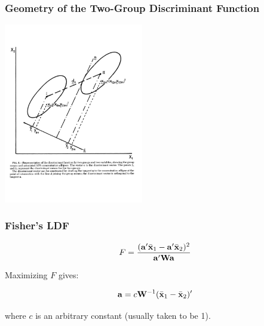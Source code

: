 \documentclass{beamer}
\begin{document}
\begin{frame}
  \frametitle{Geometry of the Two-Group Discriminant Function}

\begin{center}
\includegraphics[height=3.1in]{2group}
\end{center}

\end{frame}

\begin{frame}
  \frametitle{Fisher's LDF}


\[
F = \frac{(\mathbf{a}'\bar{\mathbf{x}}_1 - \mathbf{a}'\bar{\mathbf{x}}_2)^2}{\mathbf{a}'\mathbf{W}\mathbf{a}}
\]


Maximizing $F$ gives:

\[
\mathbf{a} = c\mathbf{W}^{-1}(\bar{\mathbf{x}}_1 - \bar{\mathbf{x}}_2)'
\]

where $c$ is an arbitrary constant (usually taken to be 1).

\end{frame}
\end{document}
